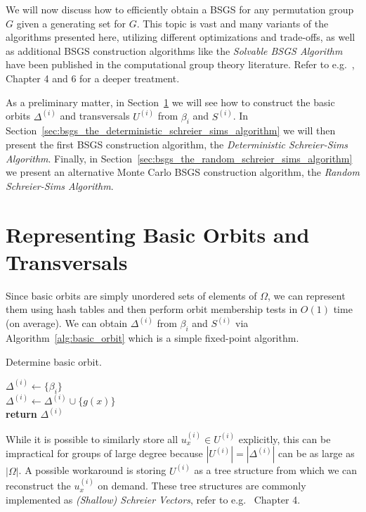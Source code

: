We will now discuss how to efficiently obtain a BSGS for any permutation group
$G$ given a generating set for $G$. This topic is vast and many variants of the
algorithms presented here, utilizing different optimizations and trade-offs, as
well as additional BSGS construction algorithms like the \textit{Solvable BSGS
Algorithm} have been published in the computational group theory literature.
Refer to e.g.~\cite{Holt}, Chapter 4 and 6 for a deeper treatment.

As a preliminary matter, in
Section~\ref{sec:bsgs_representing_basic_orbits_and_transversals} we will see
how to construct the basic orbits $\Delta^{(i)}$ and transversals $U^{(i)}$
from $\beta_i$ and $S^{(i)}$.
%
In Section~\ref{sec:bsgs_the_deterministic_schreier_sims_algorithm} we will
then present the first BSGS construction algorithm, the \textit{Deterministic
Schreier-Sims Algorithm}.
%
Finally, in Section~\ref{sec:bsgs_the_random_schreier_sims_algorithm} we
present an alternative Monte Carlo BSGS construction algorithm, the
\textit{Random Schreier-Sims Algorithm}.

\section{Representing Basic Orbits and Transversals}
\label{sec:bsgs_representing_basic_orbits_and_transversals}

Since basic orbits are simply unordered sets of elements of $\Omega$, we can
represent them using hash tables and then perform orbit membership tests
in $O(1)$ time (on average). We can obtain $\Delta^{(i)}$ from $\beta_i$ and
$S^{(i)}$ via Algorithm~\ref{alg:basic_orbit} which is a simple fixed-point
algorithm.

\begin{algorithm}
  \caption{Determine basic orbit.}
  \label{alg:basic_orbit}
  \begin{algorithmic}[1]
       \State $\Delta^{(i)} \gets \{\beta_i\}$
       \\
            \State $\Delta^{(i)} \gets \Delta^{(i)} \cup \{g(x)\}$
         \EndFor
       \EndWhile
       \\
       \State \textbf{return} $\Delta^{(i)}$
    \EndProcedure
  \end{algorithmic}
\end{algorithm}

While it is possible to similarly store all $u_x^{(i)} \in U^{(i)}$ explicitly,
this can be impractical for groups of large degree because $|U^{(i)}| =
|\Delta^{(i)}|$ can be as large as $|\Omega|$. A possible workaround is storing
$U^{(i)}$ as a tree structure from which we can reconstruct the $u_x^{(i)}$ on
demand. These tree structures are commonly implemented as \textit{(Shallow)
Schreier Vectors}, refer to e.g.~\cite{Holt} Chapter 4.

